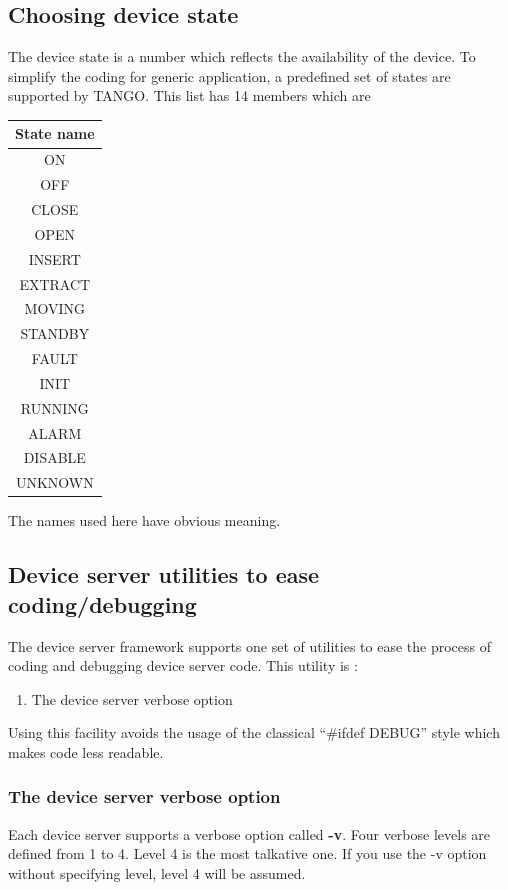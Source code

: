 \subsection{Choosing device state}

The device state is a number which reflects the availability
of the device. To simplify the coding for generic application, a predefined
set of states are supported by TANGO. This list has
14 members which are

\vspace{0.3cm}

\begin{center}
\begin{longtable}{|c|}
\hline 
State name\tabularnewline
\hline 
\hline 
ON\tabularnewline
\hline 
OFF\tabularnewline
\hline 
CLOSE\tabularnewline
\hline 
OPEN\tabularnewline
\hline 
INSERT\tabularnewline
\hline 
EXTRACT\tabularnewline
\hline 
MOVING\tabularnewline
\hline 
STANDBY\tabularnewline
\hline 
FAULT\tabularnewline
\hline 
INIT\tabularnewline
\hline 
RUNNING\tabularnewline
\hline 
ALARM\tabularnewline
\hline 
DISABLE\tabularnewline
\hline 
UNKNOWN\tabularnewline
\hline 
\end{longtable}
\par\end{center}

\vspace{0.3cm}

The names used here have obvious meaning.

\subsection{Device server utilities to ease coding/debugging}

The device server framework supports one set of utilities to ease
the process of coding and debugging device server code.
This utility is :
\begin{enumerate}
\item The device server verbose option
\end{enumerate}
Using this facility avoids the usage of the classical ``\#ifdef DEBUG''
style which makes code less readable.

\subsubsection{The device server verbose option}

Each device server supports a verbose option called
\textbf{-v}. Four verbose levels are defined from 1 to
4. Level 4 is the most talkative one. If you use the -v option without
specifying level, level 4 will be assumed.

